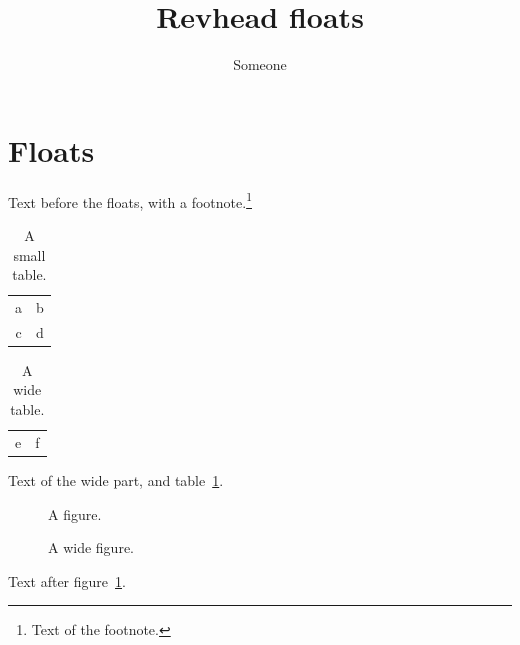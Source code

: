 \documentclass{revtex4-2}
\begin{document}
\title{Revhead floats}
\author{Someone}
\maketitle
\section{Floats}
Text before the floats, with a footnote.\footnote{Text of the footnote.}
\begin{table}
\caption{A small table.}\label{tab:one}
\begin{ruledtabular}
\begin{tabular}{cc}
a & b\\
c & d
\end{tabular}
\end{ruledtabular}
\end{table}
\begin{table}
\caption{A wide table.}
\begin{ruledtabular}
\begin{tabular}{cc}
e & f
\end{tabular}
\end{ruledtabular}
\end{table}
\begin{widetext}
Text of the wide part, and table~\ref{tab:one}.
\end{widetext}
\begin{figure}
\caption{A figure.}\label{fig:one}
\end{figure}
\begin{figure}
\caption{A wide figure.}
\end{figure}
Text after figure~\ref{fig:one}.
\end{document}

